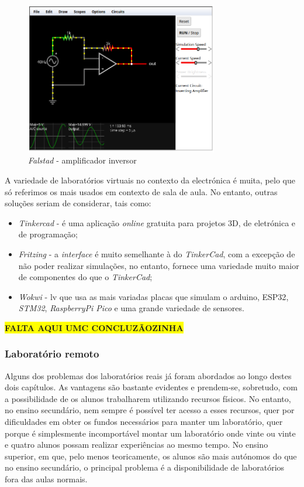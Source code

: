 \begin{figure}[hbtp]
    \centering
    \includegraphics[width=0.75\textwidth]{figures/falstad.png}
    \caption{\textit{Falstad} - amplificador inversor\cite{falstad}}
    \label{fig:falstad}
\end{figure}

A variedade de laboratórios virtuais no contexto da electrónica é muita, pelo que só referimos os mais usados em contexto de sala de aula. No entanto, outras soluções seriam de considerar, tais como:
\begin{itemize}
    \item \textit{Tinkercad} - é uma aplicação \textit{online} gratuita para projetos 3D, de eletrónica e de programação;
    \item \textit{Fritzing} - a \textit{interface} é muito semelhante à do \textit{TinkerCad}, com a excepção de não poder realizar simulações, no entanto, fornece uma variedade muito maior de componentes do que o \textit{TinkerCad};
    \item \textit{Wokwi}\cite{wokwi} - \acrshort{lv} que usa as mais variadas placas que simulam o \gls{arduino}, \gls{ESP32}, \textit{STM32}, \textit{RaspberryPi Pico} e uma grande variedade de sensores\cite{wokwi}.
\end{itemize}

\colorbox{yellow}{\textbf{FALTA AQUI UMC CONCLUZÃOZINHA}}

\subsubsection{Laboratório remoto}
\label{sec: remotelaboratory}
Alguns dos problemas dos laboratórios reais já foram abordados ao longo destes dois capítulos. As vantagens são bastante evidentes e prendem-se, sobretudo, com a possibilidade de os alunos trabalharem utilizando recursos físicos. No entanto, no ensino secundário, nem sempre é possível ter acesso a esses recursos, quer por dificuldades em obter os fundos necessários para manter um laboratório, quer porque é simplesmente incomportável montar um laboratório onde vinte ou vinte e quatro alunos possam realizar experiências ao mesmo tempo. No ensino superior, em que, pelo menos teoricamente, os alunos são mais autónomos do que no ensino secundário, o principal problema é a disponibilidade de laboratórios fora das aulas normais.

